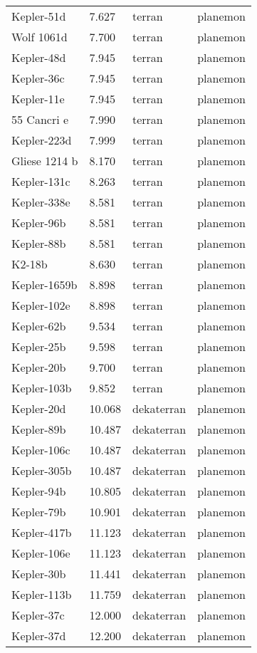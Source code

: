 \documentclass[
  letterpaper,
]{book}
\begin{document}
\begin{longtable}[]{@{}llll@{}}
Kepler-51d & 7.627 & terran & planemon \\
Wolf 1061d & 7.700 & terran & planemon \\
Kepler-48d & 7.945 & terran & planemon \\
Kepler-36c & 7.945 & terran & planemon \\
Kepler-11e & 7.945 & terran & planemon \\
55 Cancri e & 7.990 & terran & planemon \\
Kepler-223d & 7.999 & terran & planemon \\
Gliese 1214 b & 8.170 & terran & planemon \\
Kepler-131c & 8.263 & terran & planemon \\
Kepler-338e & 8.581 & terran & planemon \\
Kepler-96b & 8.581 & terran & planemon \\
Kepler-88b & 8.581 & terran & planemon \\
K2-18b & 8.630 & terran & planemon \\
Kepler-1659b & 8.898 & terran & planemon \\
Kepler-102e & 8.898 & terran & planemon \\
Kepler-62b & 9.534 & terran & planemon \\
Kepler-25b & 9.598 & terran & planemon \\
Kepler-20b & 9.700 & terran & planemon \\
Kepler-103b & 9.852 & terran & planemon \\
Kepler-20d & 10.068 & dekaterran & planemon \\
Kepler-89b & 10.487 & dekaterran & planemon \\
Kepler-106c & 10.487 & dekaterran & planemon \\
Kepler-305b & 10.487 & dekaterran & planemon \\
Kepler-94b & 10.805 & dekaterran & planemon \\
Kepler-79b & 10.901 & dekaterran & planemon \\
Kepler-417b & 11.123 & dekaterran & planemon \\
Kepler-106e & 11.123 & dekaterran & planemon \\
Kepler-30b & 11.441 & dekaterran & planemon \\
Kepler-113b & 11.759 & dekaterran & planemon \\
Kepler-37c & 12.000 & dekaterran & planemon \\
Kepler-37d & 12.200 & dekaterran & planemon \\

\end{longtable}
\end{document}
